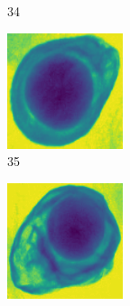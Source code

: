 \documentclass[11pt]{article}
\begin{document}
\begin{figure}[!h]
\begin{subfigure}[b]{0.22\textwidth}
         \caption{34}
         \label{fig:avo_33}
     \end{subfigure}
     \hfill
     \begin{subfigure}[b]{0.22\textwidth}
         \centering
         \includegraphics[width=\textwidth]{figurer/avocado_dataset/avo_34.jpg}
         \caption{35}
         \label{fig:avo_34}
     \end{subfigure}
     \hfill
     \begin{subfigure}[b]{0.22\textwidth}
         \centering
         \includegraphics[width=\textwidth]{figurer/avocado_dataset/avo_35.jpg}

\end{subfigure}
\end{figure}
\end{document}
